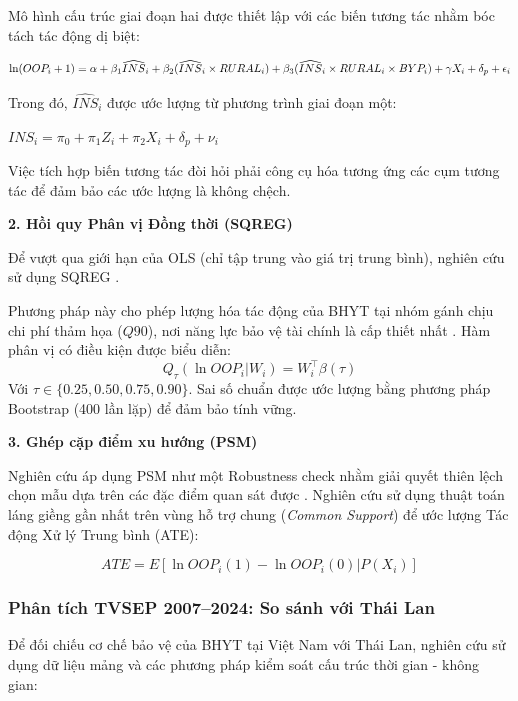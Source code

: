 \documentclass[12pt,a4paper]{article}
\begin{document}
Mô hình cấu trúc giai đoạn hai được thiết lập với các biến tương tác nhằm bóc tách tác động dị biệt:

\begin{equation}
	\small
	\ln(OOP_i + 1) = \alpha + \beta_1 \widehat{INS}_i + \beta_2 (\widehat{INS}_i \times RURAL_i) + \beta_3 (\widehat{INS}_i \times RURAL_i \times BYP_i) + \gamma X_i + \delta_p + \epsilon_i
\end{equation}

Trong đó, $\widehat{INS}_i$ được ước lượng từ phương trình giai đoạn một:

 $INS_i = \pi_0 + \pi_1 Z_i + \pi_2 X_i + \delta_p + \nu_i$
 
Việc tích hợp biến tương tác đòi hỏi phải công cụ hóa tương ứng các cụm tương tác để đảm bảo các ước lượng là không chệch.

\textbf{2. Hồi quy Phân vị Đồng thời (SQREG)}

Để vượt qua giới hạn của OLS (chỉ tập trung vào giá trị trung bình), nghiên cứu sử dụng SQREG \parencite{koenker1978}. 

Phương pháp này cho phép lượng hóa tác động của BHYT tại nhóm gánh chịu chi phí thảm họa ($Q90$), nơi năng lực bảo vệ tài chính là cấp thiết nhất \parencite{bitler2006}. Hàm phân vị có điều kiện được biểu diễn:
\begin{equation}
	Q_{\tau}(\ln OOP_i | W_i) = W_i^\top \beta(\tau)
\end{equation}
Với $\tau \in \{0.25, 0.50, 0.75, 0.90\}$. Sai số chuẩn được ước lượng bằng phương pháp Bootstrap (400 lần lặp) để đảm bảo tính vững.

\textbf{3. Ghép cặp điểm xu hướng (PSM)}

Nghiên cứu áp dụng PSM như một Robustness check nhằm giải quyết thiên lệch chọn mẫu dựa trên các đặc điểm quan sát được \parencite{rosenbaum1983}. Nghiên cứu sử dụng thuật toán láng giềng gần nhất trên vùng hỗ trợ chung (\textit{Common Support}) để ước lượng Tác động Xử lý Trung bình (ATE):

\begin{equation}
	ATE = E[\ln OOP_i(1) - \ln OOP_i(0) | P(X_i)]
\end{equation}

\subsubsection{Phân tích TVSEP 2007--2024: So sánh với Thái Lan }

Để đối chiếu cơ chế bảo vệ của BHYT tại Việt Nam với Thái Lan, nghiên cứu sử dụng dữ liệu mảng và các phương pháp kiểm soát cấu trúc thời gian - không gian:
\end{document}
